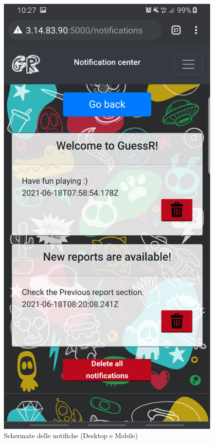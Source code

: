 \begin{figure}[H]
\begin{minipage}[b]{0.19\textwidth}
    \includegraphics[width=\textwidth]{img/screen/M notifications.jpg}
  \end{minipage}
    \caption{Schermate delle notifiche (Desktop e Mobile)}
\end{figure}

